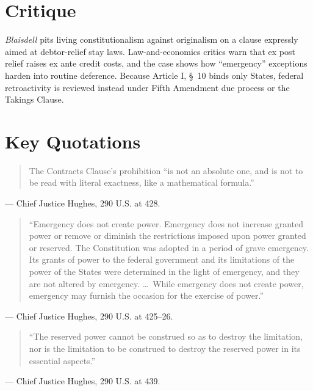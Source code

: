 \documentclass[12pt]{article}
\begin{document}
\section{Critique}

\textit{Blaisdell} pits living constitutionalism against originalism on a clause expressly aimed at debtor-relief stay laws. Law-and-economics critics warn that ex post relief raises ex ante credit costs, and the case shows how ``emergency'' exceptions harden into routine deference. Because Article I, \S\ 10 binds only States, federal retroactivity is reviewed instead under Fifth Amendment due process or the Takings Clause.

\section{Key Quotations}

\begin{quote}
The Contracts Clause's prohibition ``is not an absolute one, and is not to be read with literal exactness, like a mathematical formula.''
\end{quote}
\noindent --- Chief Justice Hughes, 290 U.S. at 428.

\begin{quote}
``Emergency does not create power. Emergency does not increase granted power or remove or diminish the restrictions imposed upon power granted or reserved. The Constitution was adopted in a period of grave emergency. Its grants of power to the federal government and its limitations of the power of the States were determined in the light of emergency, and they are not altered by emergency. \ldots\ While emergency does not create power, emergency may furnish the occasion for the exercise of power.''
\end{quote}
\noindent --- Chief Justice Hughes, 290 U.S. at 425--26.

\begin{quote}
``The reserved power cannot be construed so as to destroy the limitation, nor is the limitation to be construed to destroy the reserved power in its essential aspects.''
\end{quote}
\noindent --- Chief Justice Hughes, 290 U.S. at 439.
\end{document}
